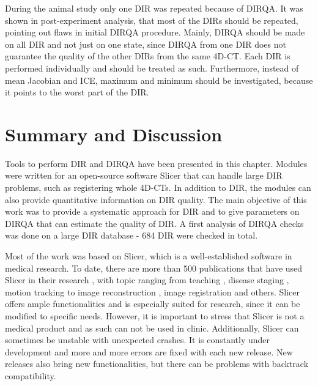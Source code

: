 During the animal study only one DIR was repeated because of DIRQA. It was shown in post-experiment analysis, that most of the DIRs should be repeated, pointing out flaws in initial DIRQA procedure.
Mainly, DIRQA should be made on all DIR and not just on one state, since DIRQA from one DIR does not guarantee the quality of the other DIRs from the same 4D-CT. 
Each DIR is performed individually and should be treated as such. Furthermore, instead of mean Jacobian and ICE, maximum and minimum should be investigated, 
because it points to the worst part of the DIR.





\section{Summary and Discussion}
\label{Summary}

Tools to perform DIR and DIRQA have been presented in this chapter. Modules were written for an open-source software Slicer that can handle large DIR problems, such as registering whole 4D-CTs. 
In addition to DIR, the modules can also provide quantitative information on DIR quality.
The main objective of this work was to provide a systematic approach for DIR and to give parameters on DIRQA that can estimate the quality of DIR. A first analysis of DIRQA checks was done on a large DIR database - 684 DIR were checked in total.

Most of the work was based on Slicer, which is a well-established software in medical research. To date, there are more than 500 publications that have used Slicer in their research \cite{SlicerCitation}, with topic ranging from 
teaching \cite{Pujol2016}, disease staging \cite{Liu2015, Liu2016b}, motion tracking \cite{Behringer2015} to image reconstruction \cite{Meyer2015}, image registration \cite{Li2015, Fedorov2015, Li2015b}
and others. Slicer offers ample functionalities and is especially suited for research, since it can be modified to specific needs. However, it is important to stress that Slicer 
is not a medical product and as such can not be used in clinic. Additionally, Slicer can sometimes be unstable with unexpected crashes. It is constantly under development and more and more errors
are fixed with each new release. New releases also bring new functionalities, but there can be problems with backtrack compatibility. 

